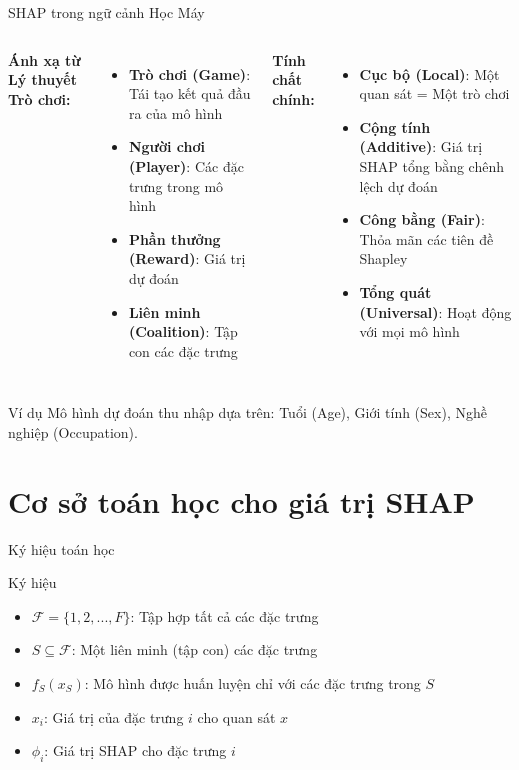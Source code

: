 \documentclass[notheorems, aspectratio=149]{beamer}
\begin{document}
\begin{frame}{SHAP trong ngữ cảnh Học Máy}
\begin{columns}
\textbf{Ánh xạ từ Lý thuyết Trò chơi:}
\begin{itemize}
    \item \textbf{Trò chơi (Game)}: Tái tạo kết quả đầu ra của mô hình
    \item \textbf{Người chơi (Player)}: Các đặc trưng trong mô hình
    \item \textbf{Phần thưởng (Reward)}: Giá trị dự đoán
    \item \textbf{Liên minh (Coalition)}: Tập con các đặc trưng
\end{itemize}

\textbf{Tính chất chính:}
\begin{itemize}
    \item \textbf{Cục bộ (Local)}: Một quan sát = Một trò chơi
    \item \textbf{Cộng tính (Additive)}: Giá trị SHAP tổng bằng chênh lệch dự đoán
    \item \textbf{Công bằng (Fair)}: Thỏa mãn các tiên đề Shapley
    \item \textbf{Tổng quát (Universal)}: Hoạt động với mọi mô hình
\end{itemize}
\end{columns}

\vspace{0.5cm}
\begin{exampleblock}{Ví dụ}
Mô hình dự đoán thu nhập dựa trên: Tuổi (Age), Giới tính (Sex), Nghề nghiệp (Occupation).
\end{exampleblock}
\end{frame}

\section{Cơ sở toán học cho giá trị SHAP}

\begin{frame}{Ký hiệu toán học}
\begin{block}{Ký hiệu}
\begin{itemize}
    \item $\mathcal{F} = \{1, 2, ..., F\}$: Tập hợp tất cả các đặc trưng
    \item $S \subseteq \mathcal{F}$: Một liên minh (tập con) các đặc trưng
    \item $f_S(x_S)$: Mô hình được huấn luyện chỉ với các đặc trưng trong $S$
    \item $x_i$: Giá trị của đặc trưng $i$ cho quan sát $x$
    \item $\phi_i$: Giá trị SHAP cho đặc trưng $i$
\end{itemize}
\end{block}
\end{frame}
\end{document}
